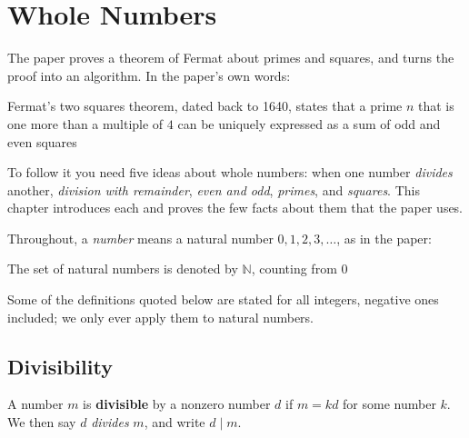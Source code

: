 \hypertarget{whole-numbers}{%
\chapter{Whole Numbers}\label{whole-numbers}}

The paper proves a theorem of Fermat about primes and squares, and turns
the proof into an algorithm. In the paper's own words:

\bpush\begin{bquote}

Fermat's two squares theorem, dated
back to 1640, states that a prime \(n\) that is one more than a multiple
of \(4\) can be uniquely expressed as a sum of odd and even squares

\end{bquote}\bpop

To follow it you need five ideas about whole numbers: when one number
\emph{divides} another, \emph{division with remainder}, \emph{even and
odd}, \emph{primes}, and \emph{squares}. This chapter introduces each
and proves the few facts about them that the paper uses.

Throughout, a \emph{number} means a natural number
\(0, 1, 2, 3, \dots\), as in the paper:

\bpush\begin{bquote}

The set of natural numbers is
denoted by \(\mathbb{N}\), counting from \(0\)

\end{bquote}\bpop

Some of the definitions quoted below are stated for all integers,
negative ones included; we only ever apply them to natural numbers.

\hypertarget{divisibility}{%
\section{Divisibility}\label{divisibility}}

\bpush\begin{bdefinition}\label{def-divides}


A number \(m\) is \textbf{divisible} by a nonzero number \(d\) if
\(m = kd\) for some number \(k\). We then say \(d\) \emph{divides}
\(m\), and write \(d \mid m\).

\end{bdefinition}\bpop

